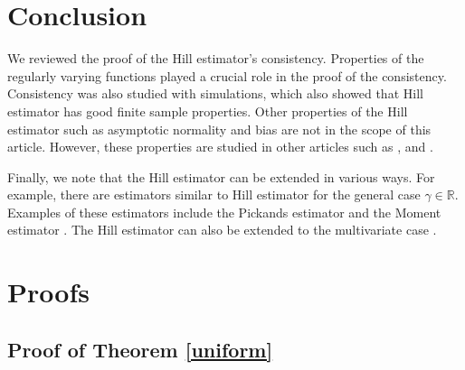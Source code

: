 \documentclass[english,12pt,a4paper,pdftex,sci,utf8]{aaltothesis} %
\begin{document}
\clearpage
\section{Conclusion}
\label{conclusion}

We reviewed the proof of the Hill estimator's consistency. Properties of the regularly varying functions played a crucial role in the proof of the consistency. Consistency was also studied with simulations, which also showed that Hill estimator has good finite sample properties. Other properties of the Hill estimator such as asymptotic normality and bias are not in the scope of this article. However, these properties are studied in other articles such as \cite{peng}, \cite{hausler} and \cite{haanResnick}.

Finally, we note that the Hill estimator can be extended in various ways. For example, there are estimators similar to Hill estimator for the general case $\gamma \in \mathbb{R}$. Examples of these estimators include the Pickands estimator \cite{pickands} and the Moment estimator \cite{dekkers}. The Hill estimator can also be extended to the multivariate case \cite{ilmonen}.

\clearpage




\thesisbibliography




\clearpage

\thesisappendix

\section{Proofs}
\label{proofs}
\subsection{Proof of Theorem \ref{uniform}}
\end{document}
